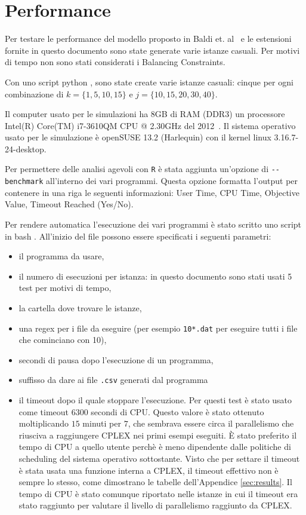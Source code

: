 \section{Performance}
\label{sec:benchmark}
Per testare le performance del modello proposto in Baldi et. 
al~\cite{Baldi20129802} e le estensioni fornite
in questo documento sono state generate varie istanze casuali.
Per motivi di tempo non sono stati considerati i Balancing Constraints. 

Con uno script python , sono state create varie
istanze casuali: cinque per ogni 
combinazione di $k = \{1,5,10,15\}$ e $j = \{10,15,20,30,40\}$. 

Il computer usato per le simulazioni ha 8GB di RAM (DDR3) un processore 
Intel(R) Core(TM) i7-3610QM CPU @ 2.30GHz del 2012~\cite{cpu}.
Il sistema operativo usato per le simulazione è openSUSE 13.2 (Harlequin) con
il kernel linux 3.16.7-24-desktop.

Per permettere delle analisi agevoli con \verb|R| è stata aggiunta un'opzione di
\verb|--benchmark| all'interno dei vari programmi. 
Questa opzione formatta l'output per contenere in una riga le seguenti 
informazioni: User Time, CPU Time, Objective Value, Timeout Reached (Yes/No).

Per rendere automatica l'esecuzione dei vari programmi è stato scritto uno 
script in bash . 
All'inizio del file possono essere specificati i seguenti parametri:
\begin{itemize}
\item il programma da usare, 
\item il numero di esecuzioni per istanza: in questo documento sono stati usati
5 test per motivi di tempo,
\item la cartella dove trovare le istanze, 
\item una regex per i file da eseguire  (per esempio \verb|10*.dat| per eseguire
 tutti i file che cominciano con 10), 
\item secondi di pausa dopo l'esecuzione di un programma,
\item suffisso da dare ai file \verb|.csv| generati dal programma
\item il timeout dopo il quale stoppare l'esecuzione.
Per questi test è stato usato come timeout $6300$ secondi di CPU. Questo valore
è stato ottenuto moltiplicando $15$ minuti per $7$, che sembrava essere
circa il parallelismo che riusciva a raggiungere CPLEX nei primi esempi eseguiti.
È stato preferito il tempo di CPU a quello utente perchè è meno dipendente dalle
politiche di scheduling del sistema operativo sottostante.
Visto che per settare il timeout è stata usata una funzione interna a CPLEX, il timeout
effettivo non è sempre lo stesso, come dimostrano le tabelle dell'Appendice \ref{sec:results}.
Il tempo di CPU è stato comunque riportato nelle istanze in cui il timeout era 
stato raggiunto per valutare il livello di parallelismo 
raggiunto da CPLEX.
\end{itemize}

